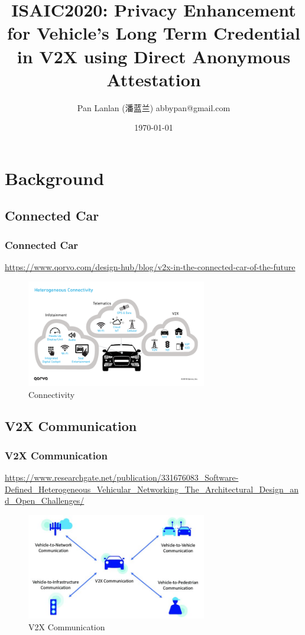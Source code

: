 \documentclass{ctexbeamer}
\title{ISAIC2020: Privacy Enhancement for Vehicle's Long Term Credential in V2X using Direct Anonymous Attestation}
\author{Pan Lanlan (潘蓝兰) \newline  \newline abbypan@gmail.com}
\institute[China]{Guangdong OPPO Mobile Telecommunications Corp. Ltd., China}
\date{\monthyeardate\today}
\begin{document}
\frame{\titlepage}

\frame{\tableofcontents}
\clearpage

\section{Background}

\subsection{Connected Car}
\begin{frame}
\frametitle{Connected Car}

    \url{https://www.qorvo.com/design-hub/blog/v2x-in-the-connected-car-of-the-future}

    \begin{figure}[H]
        \centering 
        \includegraphics[width=0.7\textwidth]{pic/connectivity.png} 
        \caption{Connectivity} 
        \label{fig.connectivity}
    \end{figure}

\end{frame}

\subsection{V2X Communication}
\begin{frame}
\frametitle{V2X Communication}

    \url{https://www.researchgate.net/publication/331676083_Software-Defined_Heterogeneous_Vehicular_Networking_The_Architectural_Design_and_Open_Challenges/}

    \begin{figure}[H]
        \centering 
        \includegraphics[width=0.7\textwidth]{pic/v2x.jpg} 
        \caption{V2X Communication} 
        \label{fig.v2x}
    \end{figure}

\end{frame}
\end{document}
